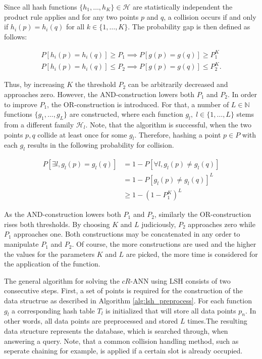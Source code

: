 Since all hash functions $\{h_1, \dots, h_K\} \in \mathcal{H}$ are statistically independent the product rule applies and for any two points $p$ and $q$, a collision occurs if and only if $h_i(p)=h_i(q)$ for all $k \in \{1, \dots, K\}$. The probability gap is then defined as follows:

\begin{align}
    P[h_i(p)=h_i(q)] \geq P_1 \implies P[g(p)=g(q)] \geq P_1^K \\
    P[h_i(p)=h_i(q)] \leq P_2 \implies P[g(p)=g(q)] \leq P_2^K.
\end{align}

Thus, by increasing $K$ the threshold $P_2$ can be arbitrarily decreased and approaches zero. However, the AND-construction lowers both $P_1$ and $P_2$. In order to improve $P_1$, the OR-construction is introduced. For that, a number of $L \in \mathbb{N}$ functions $\{g_1, \dots, g_L\}$ are constructed, where each function $g_l, \; l \in \{1, \dots, L\}$ stems from a different family $\mathcal{H}_l$. Note, that the algorithm is successful, when the two points $p, q$ collide at least once for some $g_l$. Therefore, hashing a point $p \in P$ with each $g_l$ results in the following probability for collision.

\begin{align}
    P[\exists l, g_l(p)=g_l(q)] &= 1 - P[\forall l, g_l(p) \neq g_l(q)] \\
                                &= 1 - P[g_l(p) \neq g_l(q)]^L \\
                                &\geq 1 - (1-P_1^K)^L
\end{align}

As the AND-construction lowers both $P_1$ and $P_2$, similarly the OR-construction rises both thresholds. By choosing $K$ and $L$ judiciously, $P_2$ approaches zero while $P_1$ approaches one. Both constructions may be concatenated in any order to manipulate $P_1$ and $P_2$. Of course, the more constructions are used and the higher the values for the parameters $K$ and $L$ are picked, the more time is considered for the application of the function. 

The general algorithm for solving the $cR$-ANN using LSH consists of two consecutive steps. First, a set of points is required for the construction of the data structrue as described in Algorithm \ref{alg:lsh_preprocess}. For each function $g_l$ a corresponding hash table $T_l$ is initialized that will store all data points $p_n$. In other words, all data points are preprocessed and stored $L$ times.The resulting data structure represents the database, which is searched through, when answering a query. Note, that a common collision handling method, such as seperate chaining for example, is applied if a certain slot is already occupied. 

